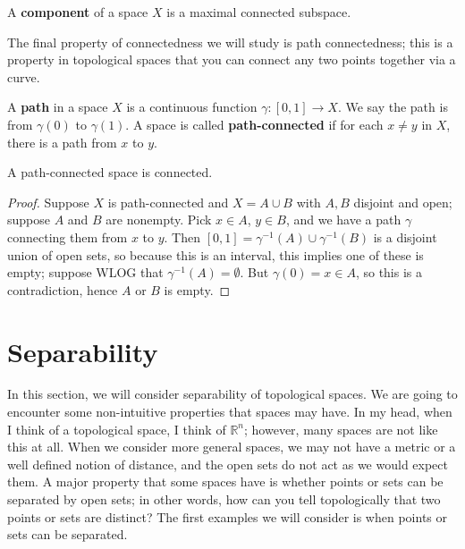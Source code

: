 	\begin{definition}[Component]
		A \textbf{component} of a space $X$ is a maximal connected subspace. 
	\end{definition}
	
	The final property of connectedness we will study is path connectedness; this is a property in topological spaces that you can connect any two points together 
	via a curve.
	
	\begin{definition}
		A \textbf{path} in a space $X$ is a continuous function $\gamma : [0, 1]\rightarrow X$. We say the path is from $\gamma(0)$ to $\gamma(1)$. A 
		space is called \textbf{path-connected} if for each $x\neq y$ in $X$, there is a path from $x$ to $y$.
	\end{definition}
	
	\begin{prop}
		A path-connected space is connected.
	\end{prop}
	
	\begin{proof}
		Suppose $X$ is path-connected and $X = A\cup B$ with $A, B$ disjoint and open; suppose $A$ and $B$ are nonempty. Pick $x\in A$, $y\in B$, and we 
		have a path $\gamma$ connecting them from $x$ to $y$. Then $[0, 1] = \gamma^{-1}(A)\cup\gamma^{-1}(B)$ is a disjoint union of open sets, so 
		because this is an interval, this implies one of these is empty; suppose WLOG that $\gamma^{-1}(A) = \emptyset$. But $\gamma(0) = x\in A$, so 
		this is a contradiction, hence $A$ or $B$ is empty.
	\end{proof}

\newpage

\section{Separability}

	In this section, we will consider separability of topological spaces. We are going to encounter some non-intuitive 
	properties that spaces may have. In my head, when I think of a topological space, I think of $\mathbb R^n$; however, 
	many spaces are not like this at all. When we consider more general spaces, we may not have a metric or a well defined 
	notion of distance, and the open sets do not act as we would expect them. A major property that some spaces have is 
	whether points or sets can be separated by open sets; in other words, how can you tell topologically that two points or 
	sets are distinct? The first examples we will consider is when points or sets can be separated.
	
